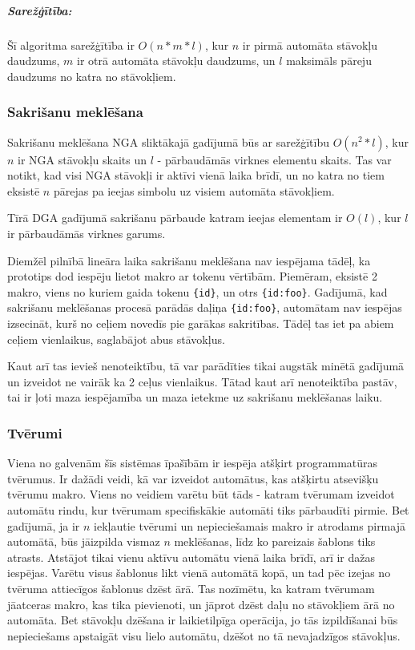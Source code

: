 \subparagraph{Sarežģītība:}
Šī algoritma sarežģītība ir $O(n*m*l)$, kur  $n$ ir pirmā automāta stāvokļu daudzums, $m$ ir otrā automāta stāvokļu daudzums, un $l$ maksimāls pāreju daudzums no katra no stāvokļiem.

\subsubsection{Sakrišanu meklēšana}
Sakrišanu meklēšana NGA sliktākajā gadījumā būs ar sarežģītību $O(n^2*l)$, kur $n$ ir NGA stāvokļu skaits un $l$ - pārbaudāmās virknes elementu skaits. Tas var notikt, kad visi NGA stāvokļi ir aktīvi vienā laika brīdī, un no katra no tiem eksistē $n$ pārejas pa ieejas simbolu uz visiem automāta stāvokļiem.

Tīrā DGA gadījumā sakrišanu pārbaude katram ieejas elementam ir $O(l)$, kur $l$ ir pārbaudāmās virknes garums. 

Diemžēl pilnībā lineāra laika sakrišanu meklēšana nav iespējama tādēļ, ka prototips dod iespēju lietot makro ar tokenu vērtībām. Piemēram, eksistē 2 makro, viens no kuriem gaida tokenu \verb|{id}|, un otrs \verb|{id:foo}|. Gadījumā, kad sakrišanu meklēšanas procesā parādās daļiņa \verb|{id:foo}|, automātam nav iespējas izsecināt, kurš no ceļiem novedīs pie garākas sakritības. Tādēļ tas iet pa abiem ceļiem vienlaikus, saglabājot abus stāvokļus.

Kaut arī tas ievieš nenoteiktību, tā var parādīties tikai augstāk minētā gadījumā un izveidot ne vairāk ka 2 ceļus vienlaikus. Tātad kaut arī nenoteiktība pastāv, tai ir ļoti maza iespējamība un maza ietekme uz sakrišanu meklēšanas laiku.

\subsubsection{Tvērumi}

Viena no galvenām šīs sistēmas īpašībām ir iespēja atšķirt programmatūras tvērumus. Ir dažādi veidi, kā var izveidot automātus, kas atšķirtu atsevišķu tvērumu makro. Viens no veidiem varētu būt tāds - katram tvērumam izveidot automātu rindu, kur tvērumam specifiskākie automāti tiks pārbaudīti pirmie. Bet gadījumā, ja ir $n$ iekļautie tvērumi un nepieciešamais makro ir atrodams pirmajā automātā, būs jāizpilda vismaz $n$ meklēšanas, līdz ko pareizais šablons tiks atrasts. Atstājot tikai vienu aktīvu automātu vienā laika brīdī, arī ir dažas iespējas. Varētu visus šablonus likt vienā automātā kopā, un tad pēc izejas no tvēruma attiecīgos šablonus dzēst ārā. Tas nozīmētu, ka katram tvērumam jāatceras makro, kas tika pievienoti, un jāprot dzēst daļu no stāvokļiem ārā no automāta. Bet stāvokļu dzēšana ir laikietilpīga operācija, jo tās izpildīšanai būs nepieciešams apstaigāt visu lielo automātu, dzēšot no tā nevajadzīgos stāvokļus.

